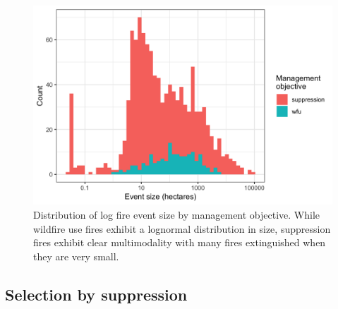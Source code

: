 \documentclass[twoside,12pt,final]{ucthesis-CA2012}
\begin{document}
\begin{ucmainmatter}
\begin{figure}
\includegraphics[width=6.00000in]{figure/chap03/fire-size-histogram-by-management-objective.png}
\caption{Distribution of log fire event size by management objective.
While wildfire use fires exhibit a lognormal distribution in size,
suppression fires exhibit clear multimodality with many fires
extinguished when they are very small.}
\end{figure}
\subsection{Selection by suppression}\label{selection-by-suppression}


\end{ucmainmatter}
\end{document}

